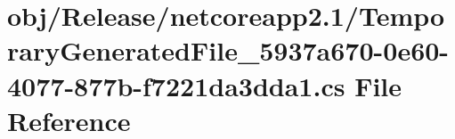 \hypertarget{_release_2netcoreapp2_81_2_temporary_generated_file__5937a670-0e60-4077-877b-f7221da3dda1_8cs}{}\section{obj/\+Release/netcoreapp2.1/\+Temporary\+Generated\+File\+\_\+5937a670-\/0e60-\/4077-\/877b-\/f7221da3dda1.cs File Reference}
\label{_release_2netcoreapp2_81_2_temporary_generated_file__5937a670-0e60-4077-877b-f7221da3dda1_8cs}
